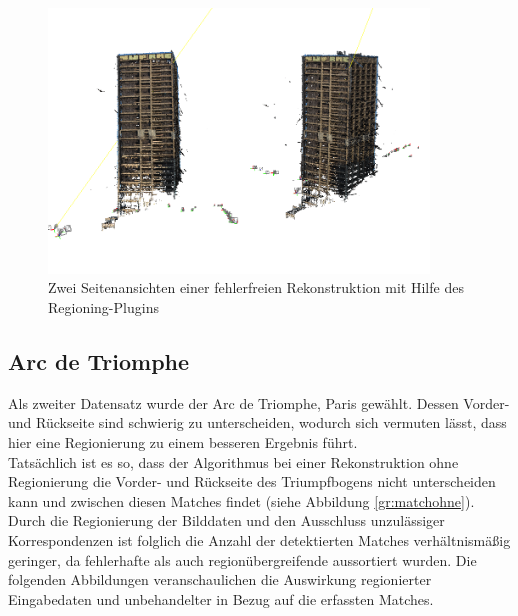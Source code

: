 \begin{figure}[h]
\centering
\includegraphics[width=0.9\textwidth]{gfx/Evaluation/finalReconstruction_AfE.png}
\caption[Zwei Seitenansichten einer fehlerfreien Rekonstruktion mit Hilfe des Regioning-Plugins]{Zwei Seitenansichten einer fehlerfreien Rekonstruktion mit Hilfe des Regioning-Plugins}
\label{gr:seitezwei}
\end{figure}
\FloatBarrier

\subsection{Arc de Triomphe}

Als zweiter Datensatz wurde der Arc de Triomphe, Paris gew\"ahlt. Dessen Vorder- und R\"uckseite sind schwierig zu unterscheiden, wodurch sich vermuten l\"asst, dass hier eine Regionierung zu einem besseren Ergebnis f\"uhrt.\\
Tats\"achlich ist es so, dass der Algorithmus bei einer Rekonstruktion ohne Regionierung die Vorder- und R\"uckseite des Triumpfbogens nicht unterscheiden kann und zwischen diesen Matches findet (siehe Abbildung \ref{gr:matchohne}).\\
Durch die Regionierung der Bilddaten und den Ausschluss unzul\"assiger Korrespondenzen ist folglich die Anzahl der detektierten Matches verh\"altnism\"a\ss ig geringer, da fehlerhafte als auch region\"ubergreifende aussortiert wurden. Die folgenden Abbildungen veranschaulichen die Auswirkung regionierter Eingabedaten und unbehandelter in Bezug auf die erfassten Matches.

